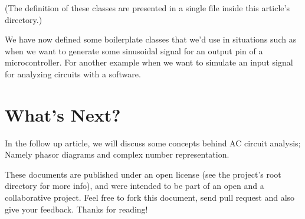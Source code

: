 \documentclass{article}
\begin{document}
	(The definition of these classes are presented in a single file inside this article's directory.)
	
	We have now defined some boilerplate classes that we'd use in situations such as when we want to generate some sinusoidal signal for an output pin of a microcontroller. For another example when we want to simulate an input signal for analyzing circuits with a software.
		
	\section{What's Next?}
	In the follow up article, we will discuss some concepts behind AC circuit analysis; Namely phasor diagrams and complex number representation.
	
	These documents are published under an open license (see the project's root directory for more info), and were intended to be part of an open and a collaborative project. Feel free to fork this document, send pull request and also give your feedback. Thanks for reading!
	
\end{document}

